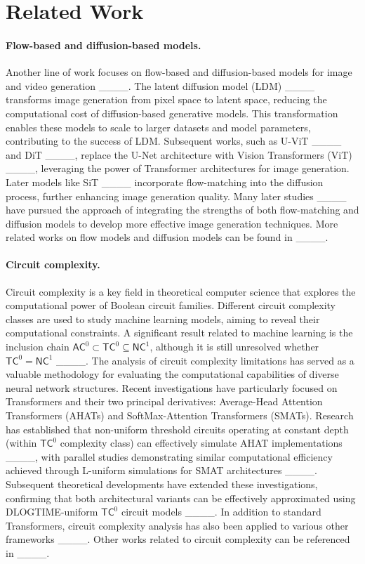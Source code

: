 \section{Related Work}
\label{sec:related_work}



\paragraph{Flow-based and diffusion-based models.} Another line of work focuses on flow-based and diffusion-based models for image and video generation ____. The latent diffusion model (LDM) ____ transforms image generation from pixel space to latent space, reducing the computational cost of diffusion-based generative models. This transformation enables these models to scale to larger datasets and model parameters, contributing to the success of LDM. Subsequent works, such as  U-ViT ____ and  DiT ____, replace the U-Net architecture with Vision Transformers (ViT) ____, leveraging the power of Transformer architectures for image generation. Later models like SiT ____ incorporate flow-matching into the diffusion process, further enhancing image generation quality. Many later studies ____ have pursued the approach of integrating the strengths of both flow-matching and diffusion models to develop more effective image generation techniques. More related works on flow models and diffusion models can be found in ____.

\paragraph{Circuit complexity.} Circuit complexity is a key field in theoretical computer science that explores the computational power of Boolean circuit families. Different circuit complexity classes are used to study machine learning models, aiming to reveal their computational constraints. A significant result related to machine learning is the inclusion chain $\mathsf{AC}^0 \subset \mathsf{TC}^0 \subseteq \mathsf{NC}^1$, although it is still unresolved whether $\mathsf{TC}^0 = \mathsf{NC}^1$ ____. 
The analysis of circuit complexity limitations has served as a valuable methodology for evaluating the computational capabilities of diverse neural network structures. Recent investigations have particularly focused on Transformers and their two principal derivatives: Average-Head Attention Transformers (AHATs) and SoftMax-Attention Transformers (SMATs). Research has established that non-uniform threshold circuits operating at constant depth (within $\mathsf{TC}^0$ complexity class) can effectively simulate AHAT implementations ____, with parallel studies demonstrating similar computational efficiency achieved through L-uniform simulations for SMAT architectures ____. Subsequent theoretical developments have extended these investigations, confirming that both architectural variants can be effectively approximated using \textsf{DLOGTIME}-uniform $\mathsf{TC}^0$ circuit models ____.
In addition to standard Transformers, circuit complexity analysis has also been applied to various other frameworks ____. Other works related to circuit complexity can be referenced in ____.